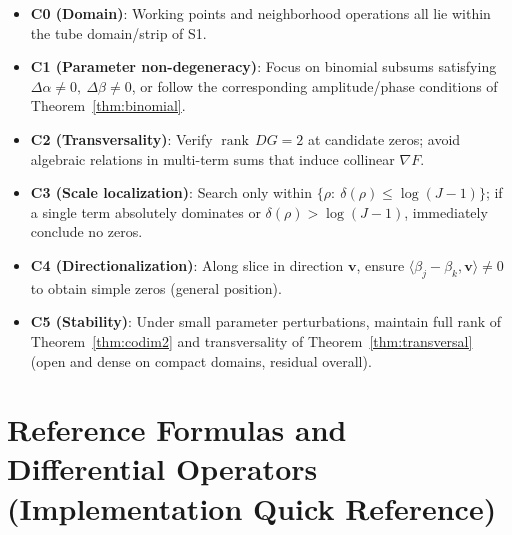 \documentclass[11pt,a4paper]{article}
\theoremstyle{remark}
\DeclareMathOperator{\rank}{rank}
\begin{document}
\begin{itemize}
\item \textbf{C0 (Domain)}: Working points and neighborhood operations all lie within the tube domain/strip of S1.

\item \textbf{C1 (Parameter non-degeneracy)}: Focus on binomial subsums satisfying $\Delta\alpha\ne0,\ \Delta\beta\ne0$, or follow the corresponding amplitude/phase conditions of Theorem~\ref{thm:binomial}.

\item \textbf{C2 (Transversality)}: Verify $\rank\,DG=2$ at candidate zeros; avoid algebraic relations in multi-term sums that induce collinear $\nabla F$.

\item \textbf{C3 (Scale localization)}: Search only within $\{\rho:\ \delta(\rho)\le \log(J-1)\}$; if a single term absolutely dominates or $\delta(\rho)>\log(J-1)$, immediately conclude no zeros.

\item \textbf{C4 (Directionalization)}: Along slice in direction $\mathbf{v}$, ensure $\langle\beta_j-\beta_k,\mathbf{v}\rangle\ne0$ to obtain simple zeros (general position).

\item \textbf{C5 (Stability)}: Under small parameter perturbations, maintain full rank of Theorem~\ref{thm:codim2} and transversality of Theorem~\ref{thm:transversal} (open and dense on compact domains, residual overall).
\end{itemize}

\section{Reference Formulas and Differential Operators (Implementation Quick Reference)}
\end{document}
